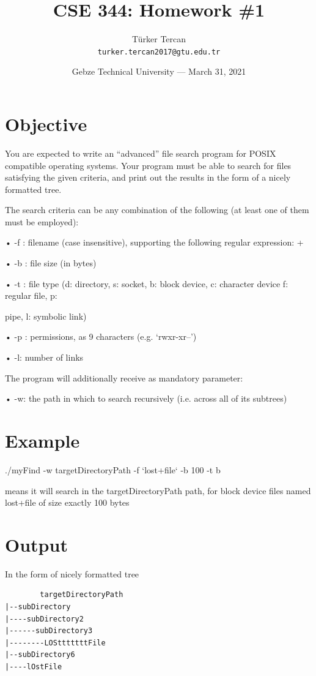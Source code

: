 \documentclass{article}
\title{CSE 344: Homework \#1} %
\author{Türker Tercan\\ \texttt{turker.tercan2017@gtu.edu.tr}} %
\date{Gebze Technical University --- March 31, 2021} %
\begin{document}
\maketitle %

\section*{Objective} %

You are expected to write an “advanced” file search program for POSIX compatible operating
systems. Your program must be able to search for files satisfying the given criteria, and print out the
results in the form of a nicely formatted tree.

\begin{info} %
	The search criteria can be any combination of the following (at least one of them must be
employed):  

• -f : filename (case insensitive), supporting the following regular expression: +

• -b : file size (in bytes)

• -t : file type (d: directory, s: socket, b: block device, c: character device f: regular file, p:

pipe, l: symbolic link)

• -p : permissions, as 9 characters (e.g. ‘rwxr-xr--’)

• -l: number of links


The program will additionally receive as mandatory parameter:

• -w: the path in which to search recursively (i.e. across all of its subtrees)


\end{info}

\section*{Example} %

./myFind -w targetDirectoryPath -f ‘lost+file‘ -b 100 -t b


means it will search in the targetDirectoryPath path, for block device files named lost+file of
size exactly 100 bytes


\section*{Output}
In the form of nicely formatted tree
\begin{commandline}
	\begin{verbatim}
		targetDirectoryPath
|--subDirectory
|----subDirectory2
|------subDirectory3
|--------LOStttttttFile
|--subDirectory6
|----lOstFile
	\end{verbatim}
\end{commandline}
\end{document}
